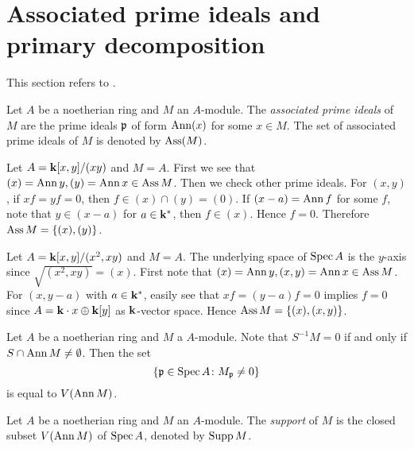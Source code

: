 \section{Associated prime ideals and primary decomposition}

    This section refers to \cite[Chapter 3]{Mat70}.

    \begin{definition}\label{def: associated prime ideals}
        Let $A$ be a noetherian ring and $M$ an $A$-module.
        The \textit{associated prime ideals} of $M$ are the prime ideals ${\mathfrak{p}}$ of form $\operatorname{Ann}(x)$ for some $x \in M$.
        The set of associated prime ideals of $M$ is denoted by $\operatorname{Ass}(M)$.
    \end{definition}

    \begin{example}
        Let $A = {\mathbf{k}}[x,y]/(xy)$ and $M = A$.
        First we see that $(x) = \operatorname{Ann} y, (y) = \operatorname{Ann} x \in \operatorname{Ass} M$.
        Then we check other prime ideals.
        For $(x,y)$, if $xf = yf = 0$, then $f \in (x) \cap (y) = (0)$.
        If $(x-a) = \operatorname{Ann} f$ for some $f$, note that $y \in (x-a)$ for $a \in {\mathbf{k}}^*$, then $f \in (x)$.
        Hence $f = 0$. 
        Therefore $\operatorname{Ass} M = \{ (x), (y) \}$.
    \end{example}

    \begin{example}
        Let $A = {\mathbf{k}}[x,y]/(x^2, xy)$ and $M = A$.
        The underlying space of $\operatorname{Spec} A$ is the $y$-axis since $\sqrt{(x^2,xy)} = (x)$.
        First note that $(x) = \operatorname{Ann} y, (x,y) = \operatorname{Ann} x \in \operatorname{Ass} M$.
        For $(x,y-a)$ with $a \in {\mathbf{k}}^*$, easily see that $xf = (y-a)f = 0$ implies $f=0$ since $A = {\mathbf{k}} \cdot x \oplus {\mathbf{k}}[y]$ as ${\mathbf{k}}$-vector space.
        Hence $\operatorname{Ass} M = \{ (x), (x,y) \}$.
    \end{example}

    Let $A$ be a noetherian ring and $M$ a  $A$-module.
    Note that $S^{-1}M = 0$ if and only if $S \cap \operatorname{Ann} M \neq \emptyset$.
    Then the set 
    \[ \{ {\mathfrak{p}} \in \operatorname{Spec} A \colon M_{\mathfrak{p}} \neq 0 \} \]
    is equal to $V(\operatorname{Ann} M)$.
    
    \begin{definition}\label{def: support of a module}
        Let $A$ be a noetherian ring and $M$ an $A$-module.
        The \textit{support} of $M$ is the closed subset $V(\operatorname{Ann} M)$ of $\operatorname{Spec} A$, denoted by $\operatorname{Supp} M$.
    \end{definition}

